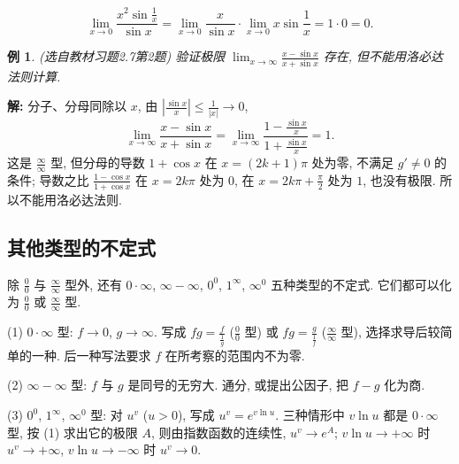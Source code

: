 \documentclass[UTF8,openany]{ctexbook}
\theoremstyle{chinesetextbook}
\newtheorem{example}{例}[section]
\newenvironment{cnsolution}{\par\indent\textbf{解:} \ignorespaces}{\par}
\begin{document}
\[
\lim_{x\to0}\frac{x^2\sin\frac1x}{\sin x}=\lim_{x\to0}\frac x{\sin x}\cdot\lim_{x\to0}x\sin\frac1x=1\cdot0=0.
\]
\begin{example}\label{ex:c2-h7-2}
\textnormal{(选自教材习题2.7第2题)} 验证极限 $\displaystyle\lim_{x\to\infty}\frac{x-\sin x}{x+\sin x}$ 存在, 但不能用洛必达法则计算.
\end{example}
\begin{cnsolution}
分子、分母同除以 $x$, 由 $\displaystyle\left|\frac{\sin x}x\right|\le\frac1{|x|}\to0$,
\[
\lim_{x\to\infty}\frac{x-\sin x}{x+\sin x}=\lim_{x\to\infty}\frac{1-\frac{\sin x}x}{1+\frac{\sin x}x}=1.
\]
这是 $\displaystyle\frac\infty\infty$ 型, 但分母的导数 $1+\cos x$ 在 $x=(2k+1)\pi$ 处为零, 不满足 $g'\ne0$ 的条件; 导数之比 $\displaystyle\frac{1-\cos x}{1+\cos x}$ 在 $x=2k\pi$ 处为 $0$, 在 $\displaystyle x=2k\pi+\frac\pi2$ 处为 $1$, 也没有极限. 所以不能用洛必达法则.
\end{cnsolution}
\subsection{其他类型的不定式}
除 $\displaystyle\frac00$ 与 $\displaystyle\frac\infty\infty$ 型外, 还有 $0\cdot\infty$, $\infty-\infty$, $0^0$, $1^\infty$, $\infty^0$ 五种类型的不定式. 它们都可以化为 $\displaystyle\frac00$ 或 $\displaystyle\frac\infty\infty$ 型.

(1) $0\cdot\infty$ 型: $f\to0$, $g\to\infty$. 写成 $\displaystyle fg=\frac f{\frac1g}$ ($\displaystyle\frac00$ 型) 或 $\displaystyle fg=\frac g{\frac1f}$ ($\displaystyle\frac\infty\infty$ 型), 选择求导后较简单的一种. 后一种写法要求 $f$ 在所考察的范围内不为零.

(2) $\infty-\infty$ 型: $f$ 与 $g$ 是同号的无穷大. 通分, 或提出公因子, 把 $f-g$ 化为商.

(3) $0^0$, $1^\infty$, $\infty^0$ 型: 对 $u^v$ ($u>0$), 写成 $u^v=e^{v\ln u}$. 三种情形中 $v\ln u$ 都是 $0\cdot\infty$ 型, 按 (1) 求出它的极限 $A$, 则由指数函数的连续性, $u^v\to e^A$; $v\ln u\to+\infty$ 时 $u^v\to+\infty$, $v\ln u\to-\infty$ 时 $u^v\to0$.
\end{document}
